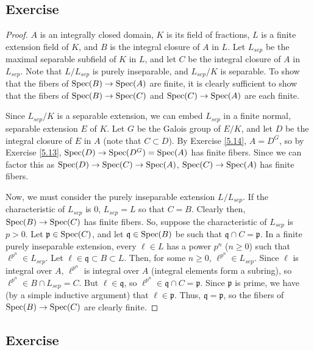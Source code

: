 \subsection{Exercise}\label{5.15}

\begin{proof}
$A$ is an integrally closed domain, $K$ is its field of fractions, $L$ is a finite extension field of $K$, and $B$ is the integral
closure of $A$ in $L$. Let $L_{sep}$ be the maximal separable subfield of $K$ in $L$, and let $C$ be the integral closure of $A$ in 
$L_{sep}$. Note that $L/L_{sep}$ is purely inseparable, and $L_{sep}/K$ is separable. To show that the fibers of $\operatorname{Spec}(B) \to \operatorname{Spec}(A)$
are finite, it is clearly sufficient to show that the fibers of $\operatorname{Spec}(B) \to \operatorname{Spec}(C)$ and $\operatorname{Spec}(C) \to \operatorname{Spec}(A)$ are each finite.

Since $L_{sep}/K$ is a separable extension, we can embed $L_{sep}$ in a finite normal, separable extension $E$ of $K$. Let $G$ be the 
Galois group of $E/K$, and let $D$ be the integral closure of $E$ in $A$ (note that $C \subset D$). By Exercise \ref{5.14}, $A = D^G$,
so by Exercise \ref{5.13}, $\operatorname{Spec}(D) \to \operatorname{Spec}(D^G) = \operatorname{Spec}(A)$ has finite fibers. Since we can factor this as
$\operatorname{Spec}(D) \to \operatorname{Spec}(C) \to \operatorname{Spec}(A)$, $\operatorname{Spec}(C) \to \operatorname{Spec}(A)$ has finite fibers.

Now, we must consider the purely inseparable extension $L/L_{sep}$. If the characteristic of $L_{sep}$ is $0$, $L_{sep} = L$ so that
$C = B$. Clearly then, $\operatorname{Spec}(B) \to \operatorname{Spec}(C)$ has finite fibers. So, suppose the characteristic of
$L_{sep}$ is $p > 0$. Let $\mathfrak{p} \in \operatorname{Spec}(C)$, and let $\mathfrak{q} \in \operatorname{Spec}(B)$ be such that $\mathfrak{q} \cap C = \mathfrak{p}$.
In a finite purely inseparable extension, every $\ell \in L$ has a power $p^n$ ($n \ge 0$) such that $\ell^{p^n} \in L_{sep}$. Let 
$\ell \in \mathfrak{q} \subset B \subset L$. Then, for some $n \ge 0$, $\ell^{p^n} \in L_{sep}$. Since $\ell$ is integral over $A$, 
$\ell^{p^n}$ is integral over $A$ (integral elements form a subring), so $\ell^{p^n} \in B \cap L_{sep} = C$. But $\ell \in \mathfrak{q}$, so 
$\ell^{p^n} \in \mathfrak{q} \cap C = \mathfrak{p}$. Since $\mathfrak{p}$ is prime, we have (by a simple inductive argument) that 
$\ell \in \mathfrak{p}$. Thus, $\mathfrak{q} = \mathfrak{p}$, so the fibers of $\operatorname{Spec}(B) \to \operatorname{Spec}(C)$ are clearly finite.
\end{proof}

\subsection{Exercise}\label{5.16}

